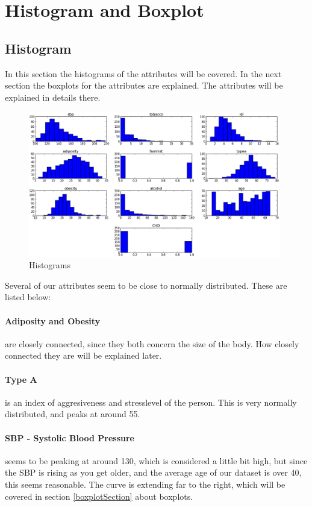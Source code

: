 \section{Histogram and Boxplot}
\subsection{Histogram}
In this section the histograms of the attributes will be covered. In the next section the boxplots for the attributes are explained. The attributes will be explained in details there.
\begin{figure}[H]
\centering
\includegraphics[width=11cm, keepaspectratio=true]{pictures/histogram.png}
\vspace{-0.2cm}
\caption{\footnotesize Histograms}
\vspace{-0.5cm}
\label{histogram}
\end{figure}
Several of our attributes seem to be close to normally distributed. These are listed below:
\paragraph{Adiposity and Obesity} are closely connected, since they both concern the size of the body. How closely connected they are will be explained later.

\paragraph{Type A} is an index of aggresiveness and stresslevel of the person. This is very normally distributed, and peaks at around 55.

\paragraph{SBP - Systolic Blood Pressure} 	seems to be peaking at around 130, which is considered a little bit high, but since the SBP is rising as you get older, and the average age of our dataset is over 40, this seems reasonable. The curve is extending far to the right, which will be covered in section \ref{boxplotSection} about boxplots.

